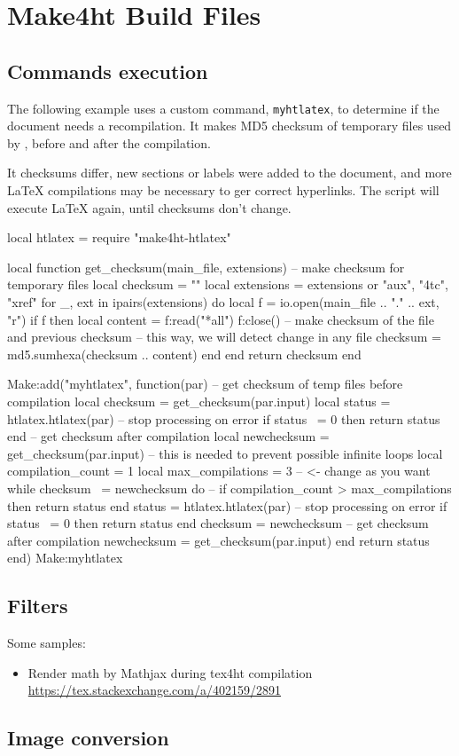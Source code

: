 \chapter{Make4ht Build Files}
\label{sec:make4ht-build-files}
\section{Commands execution}

The following example uses a custom command, \texttt{myhtlatex}, to 
determine if the document needs a recompilation. It makes MD5 checksum
of temporary files used by \texfourht{}, before and after the compilation.

It checksums differ, new sections or labels were added to the document, 
and more \LaTeX{} compilations may be necessary to ger correct hyperlinks.
The script will execute \LaTeX{} again, until checksums don't change.


\begin{luasource}
local htlatex = require "make4ht-htlatex"

local function get_checksum(main_file, extensions)
  -- make checksum for temporary files
  local checksum = ""
  local extensions = extensions or {"aux", "4tc", "xref"}
  for _, ext in ipairs(extensions) do
    local f = io.open(main_file .. "." .. ext, "r")
    if f then
      local content = f:read("*all")
      f:close()
      -- make checksum of the file and previous checksum
      -- this way, we will detect change in any file
      checksum = md5.sumhexa(checksum .. content)
    end
  end
  return checksum
end

Make:add("myhtlatex", function(par)
  -- get checksum of temp files before compilation
  local checksum = get_checksum(par.input)
  local status = htlatex.htlatex(par)
  -- stop processing on error
  if status ~= 0 then return status end
  -- get checksum after compilation
  local newchecksum = get_checksum(par.input)
  -- this is needed to prevent possible infinite loops
  local compilation_count = 1
  local max_compilations  = 3 -- <- change as you want
  while checksum ~= newchecksum do
    -- 
    if compilation_count > max_compilations then return status end
    status = htlatex.htlatex(par)
    -- stop processing on error
    if status ~= 0 then return status end
    checksum = newchecksum
    -- get checksum after compilation
    newchecksum = get_checksum(par.input)
  end
  return status
end)
Make:myhtlatex {}
\end{luasource}

\section{Filters}

Some samples:

\begin{itemize}
  \item Render math by Mathjax during tex4ht compilation \url{https://tex.stackexchange.com/a/402159/2891}
\end{itemize}
\section{Image conversion}
